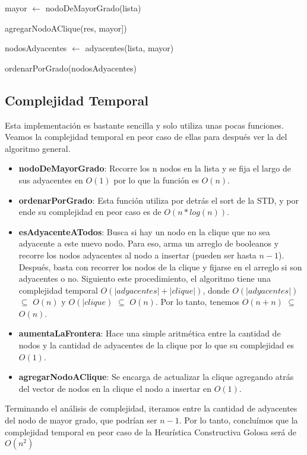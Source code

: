 \begin{algorithm}[H]
	\NoCaptionOfAlgo
	\caption{}

    mayor $\leftarrow$ nodoDeMayorGrado(lista)

    agregarNodoAClique(res, mayor])

    nodosAdyacentes $\leftarrow$ adyacentes(lista, mayor)

    ordenarPorGrado(nodosAdyacentes)

\end{algorithm}

\subsection{Complejidad Temporal}

Esta implementación es bastante sencilla y solo utiliza unas pocas funciones. Veamos la complejidad temporal en peor caso de ellas para después ver la del algoritmo general.

\begin{itemize}
	 \item \textbf{nodoDeMayorGrado}: Recorre los n nodos en la lista y se fija el largo de sus adyacentes en $O(1)$ por lo que la función es $O(n)$.

	\item \textbf{ordenarPorGrado}: Esta función utiliza por detrás el sort de la STD, y por ende su complejidad en peor caso es de $O(n*log(n))$.

\item \textbf{esAdyacenteATodos}: Busca si hay un nodo en la clique que no sea adyacente a este nuevo nodo. Para eso, arma un arreglo de booleanos y recorre los nodos adyacentes al nodo a insertar (pueden ser hasta $n-1$). Después, basta con recorrer los nodos de la clique y fijarse en el arreglo si son adyacentes o no. Siguiento este procedimiento, el algoritmo tiene una complejidad temporal $O(|adyacentes| + |clique|)$, donde $O(|adyacentes|)$ $\subseteq$ $O(n)$ y $O(|clique)$ $\subseteq$ $O(n)$. Por lo tanto, tenemos $O(n + n)$  $\subseteq$ $O(n)$.

\item \textbf{aumentaLaFrontera}: Hace una simple aritmética entre la cantidad de nodos y la cantidad de adyacentes de la clique por lo que su complejidad es $O(1)$.

\item \textbf{agregarNodoAClique}: Se encarga de actualizar la clique agregando atrás del vector de nodos en la clique el nodo a insertar en $O(1)$.

\end{itemize}

Terminando el análisis de complejidad, iteramos entre la cantidad de adyacentes del nodo de mayor grado, que podrían ser $n-1$. Por lo tanto, concluímos que la complejidad temporal en peor caso de la Heurística Constructiva Golosa será de $O(n^2)$

